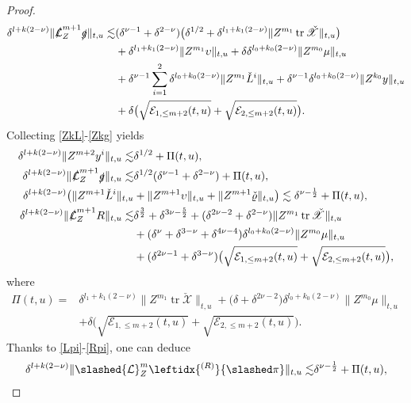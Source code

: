 \documentclass[11pt,twoside]{article}
\def \no{\nonumber}
\def\f{\frac}
\begin{document}
\begin{proof}
\begin{equation}
\begin{split}
\delta^{l+k(2-\nu)}\|\slashed{\mathcal L}_Z^{m+1}\slashed g\|_{t,u}\lesssim&(\delta^{\nu-1}+\delta^{2-\nu})\bigl(\delta^{1/2}+\delta^{l_1+k_1(2-\nu)}\|Z^{m_1}\operatorname{tr}\check{\mathscr X}\|_{t,u}\bigr)\\
&+\delta^{l_1+k_1(2-\nu)}\|Z^{m_1}\upsilon\|_{t,u}+\delta\delta^{l_{0}+k_0(2-\nu)}\|Z^{m_{0}}\mu\|_{t,u}\\
&+\delta^{\nu-1}\sum_{i=1}^2\delta^{l_0+k_0(2-\nu)}\|Z^{m_1}\check L^i\|_{t,u}+\delta^{\nu-1}\delta^{l_0+k_0(2-\nu)}\|Z^{k_0}y\|_{t,u}\\
&+ \delta \bigl( \sqrt{\mathcal{E}_{1,\leq m+2}(t,u)} + \sqrt{\mathcal{E}_{2,\leq m+2}(t,u)} \bigr).
\end{split}
\end{equation}
Collecting \eqref{ZkL}-\eqref{Zkg} yields
\begin{align}
\delta^{l+k(2-\nu)}\|Z^{m+2}y^i\|_{t,u}\lesssim &\delta^{1/2}+\Pi(t,u),\label{Zk1x}\\
\delta^{l+k(2-\nu)}\|\slashed{\mathcal L}_Z^{m+1}\slashed g\|_{t,u}\lesssim&\delta^{1/2}(\delta^{\nu-1}+\delta^{2-\nu})+\Pi(t,u),\label{Zk1g}\\
\delta^{l+k(2-\nu)}\bigl(\|Z^{m+1}\check L^i\|_{t,u}&+\|Z^{m+1}\upsilon\|_{t,u}+\|Z^{m+1}\check\varrho\|_{t,u}\bigr)\lesssim\delta^{\nu-\f12}+\Pi(t,u),\label{Zk1L}\\
\delta^{l+k(2-\nu)}\|\slashed{\mathcal L}_Z^{m+1}R\|_{t,u}\lesssim & \delta^{\f32}+\delta^{3\nu-\f52}+(\delta^{2\nu-2}+\delta^{2-\nu})\|Z^{m_1}\operatorname{tr}\check{\mathscr X}\|_{t,u}\no\\
&+(\delta^\nu+\delta^{3-\nu}+\delta^{4\nu-4})\delta^{l_{0}+k_0(2-\nu)}\|Z^{m_{0}}\mu\|_{t,u}\no\\
&+(\delta^{2\nu-1}+\delta^{3-\nu})\bigl( \sqrt{\mathcal{E}_{1,\leq m+2}(t,u)} + \sqrt{\mathcal{E}_{2,\leq m+2}(t,u)} \bigr),\label{Zk1R}
\end{align}
where
\begin{align*}
\Pi(t,u)=&\delta^{l_1+k_1(2-\nu)}\|Z^{m_1}\operatorname{tr}\check{\mathscr X}\|_{t,u}+\bigl( \delta + \delta^{2\nu-2} \bigr) \delta^{l_0+k_0(2-\nu)} \| Z^{m_0}\mu \|_{t,u}\\
&+\delta \big( \sqrt{\mathcal{E}_{1,\leq m+2}(t,u)} + \sqrt{\mathcal{E}_{2,\leq m+2}(t,u)} \big).
\end{align*}
Thanks to \eqref{Lpi}-\eqref{Rpi}, one can deduce
\begin{align}
\delta^{l+k(2-\nu)}\|\slashed{\mathcal L}_Z^{m}\leftidx{^{(R)}}{\slashed\pi}\|_{t,u}\lesssim&\delta^{\nu-\f12}+\Pi(t,u),\label{ZkRp}\\

\end{align}
\end{proof}
\end{document}
